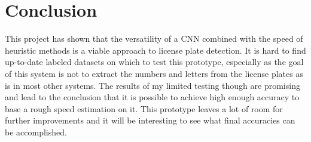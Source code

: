 \chapter{Conclusion} \label{cha:Conclusion}

This project has shown that the versatility of a CNN combined with the speed of heuristic methods is a viable approach to license plate detection.
It is hard to find up-to-date labeled datasets on which to test this prototype, especially as the goal of this system is not to extract the numbers and letters from the license plates as is in most other systems.
The results of my limited testing though are promising and lead to the conclusion that it is possible to achieve high enough accuracy to base a rough speed estimation on it.
This prototype leaves a lot of room for further improvements and it will be interesting to see what final accuracies can be accomplished.